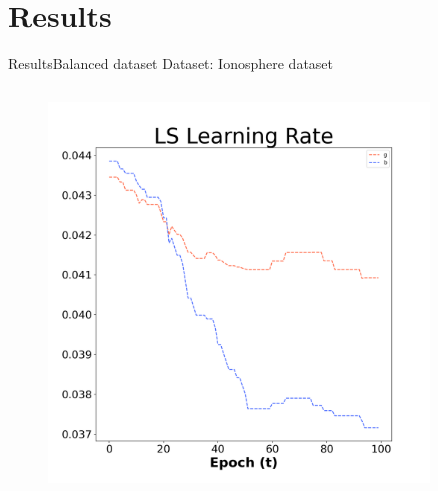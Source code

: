 \documentclass[
	aspectratio=169,	%
	onlytextwidth,		%
	t,					%
	]{beamer}
\begin{document}
	\section{Results}
	\begin{frame}[fragile]{Results}{Balanced dataset}
		\scriptsize
		Dataset: Ionosphere dataset~\cite{ion} %
		\newline
		
		\begin{columns}
			
			\begin{column}[T]{0.33\textwidth}
				\begin{figure}
					\includegraphics[width=0.9\textwidth]{myfigs/LS_b.png}
				\end{figure}
			\end{column}
		

\end{columns}
\end{frame}
\end{document}
